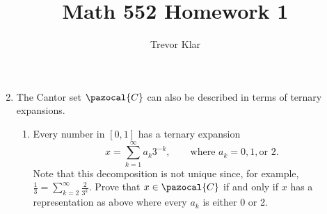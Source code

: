 \documentclass[letterpaper]{article}
\title{Math 552 \linebreak
Homework 1}
\author{Trevor Klar}
\renewcommand{\mathcal}[1]{\pazocal{#1}}
\begin{document}
\maketitle

\begin{enumerate}
	\setcounter{enumi}{1}
	\item The Cantor set $\mathcal{C}$ can also be described in terms of ternary expansions.
	\begin{enumerate}
		\item Every number in $[0, 1]$ has a ternary expansion
		$$ x= \sum_{k=1}^{\infty}a_k3^{-k}, \quad \quad \text{where }a_k = 0, 1, \text{or } 2.$$
		Note that this decomposition is not unique since, for example, $\frac{1}{3} = \sum_{k=2}^{\infty}\frac{2}{3^k}.$ Prove that $x \in  \mathcal{C}$ if and only if $x$ has a representation as above where every $a_k$ is either 0 or 2.


\end{enumerate}
\end{enumerate}
\end{document}
